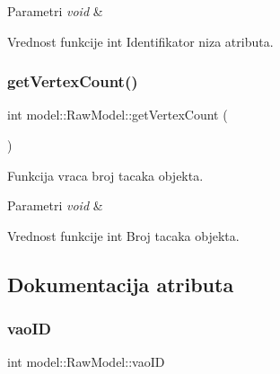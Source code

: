 \begin{DoxyParams}{Parametri}
{\em void} & \\
\hline
\end{DoxyParams}
\begin{DoxyReturn}{Vrednost funkcije}
int Identifikator niza atributa. 
\end{DoxyReturn}
\mbox{\label{classmodel_1_1RawModel_a2216788939e3b42e7de828607d4a911d}} 
\subsubsection{\texorpdfstring{get\+Vertex\+Count()}{getVertexCount()}}
{\footnotesize\ttfamily int model\+::\+Raw\+Model\+::get\+Vertex\+Count (\begin{DoxyParamCaption}\item[{void}]{ }\end{DoxyParamCaption})}



Funkcija vraca broj tacaka objekta. 


\begin{DoxyParams}{Parametri}
{\em void} & \\
\hline
\end{DoxyParams}
\begin{DoxyReturn}{Vrednost funkcije}
int Broj tacaka objekta. 
\end{DoxyReturn}


\subsection{Dokumentacija atributa}
\mbox{\label{classmodel_1_1RawModel_a325b2b7e719afce688027efbf92e27b7}} 
\subsubsection{\texorpdfstring{vao\+ID}{vaoID}}
{\footnotesize\ttfamily int model\+::\+Raw\+Model\+::vao\+ID\hspace{0.3cm}{\ttfamily [private]}}



